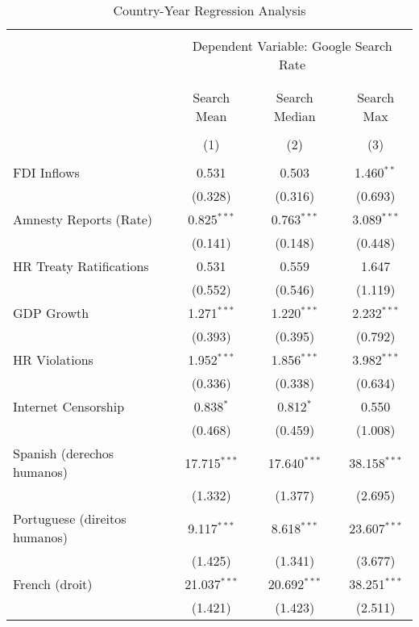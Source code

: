 
\begin{table}[!htbp] \centering 
  \caption{Country-Year Regression Analysis} 
  \label{} 
\begin{tabular}{@{\extracolsep{5pt}}lccc} 
\\[-1.8ex]\hline 
\hline \\[-1.8ex] 
 & \multicolumn{3}{c}{Dependent Variable: Google Search Rate} \\ 
\cline{2-4} 
\\[-1.8ex] & \multicolumn{3}{c}{ } \\ 
 & Search Mean & Search Median & Search Max \\ 
\\[-1.8ex] & (1) & (2) & (3)\\ 
\hline \\[-1.8ex] 
 FDI Inflows & 0.531 & 0.503 & 1.460$^{**}$ \\ 
  & (0.328) & (0.316) & (0.693) \\ 
  Amnesty Reports (Rate) & 0.825$^{***}$ & 0.763$^{***}$ & 3.089$^{***}$ \\ 
  & (0.141) & (0.148) & (0.448) \\ 
  HR Treaty Ratifications & 0.531 & 0.559 & 1.647 \\ 
  & (0.552) & (0.546) & (1.119) \\ 
  GDP Growth & 1.271$^{***}$ & 1.220$^{***}$ & 2.232$^{***}$ \\ 
  & (0.393) & (0.395) & (0.792) \\ 
  HR Violations & 1.952$^{***}$ & 1.856$^{***}$ & 3.982$^{***}$ \\ 
  & (0.336) & (0.338) & (0.634) \\ 
  Internet Censorship & 0.838$^{*}$ & 0.812$^{*}$ & 0.550 \\ 
  & (0.468) & (0.459) & (1.008) \\ 
  Spanish (derechos humanos) & 17.715$^{***}$ & 17.640$^{***}$ & 38.158$^{***}$ \\ 
  & (1.332) & (1.377) & (2.695) \\ 
  Portuguese (direitos humanos) & 9.117$^{***}$ & 8.618$^{***}$ & 23.607$^{***}$ \\ 
  & (1.425) & (1.341) & (3.677) \\ 
  French (droit) & 21.037$^{***}$ & 20.692$^{***}$ & 38.251$^{***}$ \\ 
  & (1.421) & (1.423) & (2.511) \\ 

\end{tabular}
\end{table}
